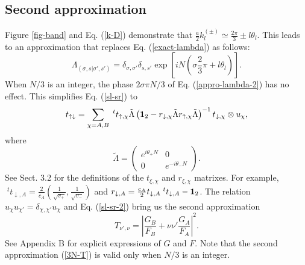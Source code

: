 \documentclass{jpsj3}
\begin{document}
\subsection{Second approximation} 
Figure \ref{fig-band} and Eq. (\ref{k-D}) demonstrate that 
$\frac{a}{2}k_l^{(\pm)} \simeq \frac{2\pi}{3} \pm l\theta_l$.
This leads to an approximation that replaces Eq. (\ref{exact-lambda}) 
 as follows:
\begin{equation}
\Lambda_{(\sigma,s|\sigma',s')}
=
\delta_{\sigma,\sigma'}\delta_{s,s'}\exp\left[iN \left(\sigma\frac{2}{3}\pi 
+l\theta_l\right) \right].
\label{appro-lambda-2} 
\end{equation}
When $N/3$ is an integer, 
the phase $2\sigma\pi N/3$ of Eq. (\ref{appro-lambda-2}) 
has no effect. This simplifies Eq. (\ref{sl-sr}) to
\begin{equation}
t_{\uparrow\downarrow}=
\sum_{\chi=A,B} 
\;^tt_{\uparrow,\chi} \tilde{\Lambda}
\left({\bf 1}_2-r_{\downarrow,\chi}\tilde{\Lambda} r_{\uparrow,\chi}
\tilde{\Lambda}\right)^{-1}
t_{\downarrow,\chi}\otimes u_\chi,
\label{sl-sr-2}
\end{equation}
where
\begin{equation}
\tilde{\Lambda}=
\left(
\begin{array}{cc}
e^{i\theta_+ N}
& 0 \\
0 & e^{-i\theta_- N}
\end{array}
\right).
\end{equation}
See  Sect. 3.2 for the definitions  of  the $t_{\xi,\chi}$ and $r_{\xi,\chi}$ matrixes.
For example, $\;^tt_{\downarrow, A}=\frac{2}{c_A}\left( \frac{1}{\sqrt{v_+}},\frac{1}{\sqrt{v_-}}\right)$ and 
$r_{\downarrow, A}= \frac{c_A}{2}t_{\downarrow, A}\;^tt_{\downarrow, A} -{\bf 1}_2$.
The relation $u_\chi u_{\chi'} =\delta_{\chi,\chi'} u_\chi$ 
and Eq. (\ref{sl-sr-2}) bring us
the second approximation
\begin{equation}
T_{\nu',\nu}=
\left| 
\frac{G_B}{F_B} +\nu\nu'
\frac{G_A}{F_A}
\right|^2.
\label{3N-T}
\end{equation}
See Appendix B for explicit expressions
of $G$ and $F$.
Note that the second approximation (\ref{3N-T}) is valid
only when $N/3$ is an integer.
\end{document}
